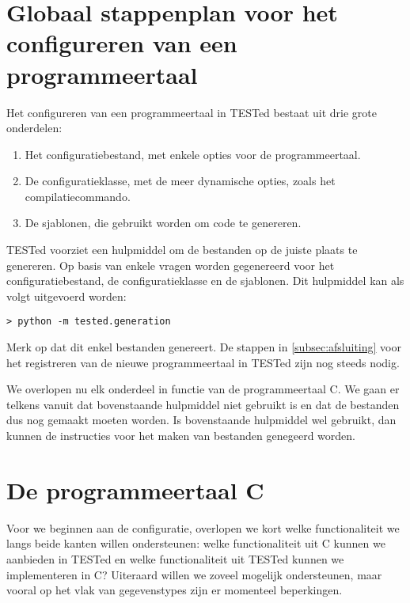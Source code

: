 \section{Globaal stappenplan voor het configureren van een programmeertaal}\label{sec:globaal-stappenplan-voor-het-configureren}

Het configureren van een programmeertaal in TESTed bestaat uit drie grote onderdelen:

\begin{enumerate}
    \item Het configuratiebestand, met enkele opties voor de programmeertaal.
    \item De configuratieklasse, met de meer dynamische opties, zoals het compilatiecommando.
    \item De sjablonen, die gebruikt worden om code te genereren.
\end{enumerate}

TESTed voorziet een hulpmiddel om de bestanden op de juiste plaats te genereren.
Op basis van enkele vragen worden  gegenereerd voor het configuratiebestand, de configuratieklasse en de sjablonen.
Dit hulpmiddel kan als volgt uitgevoerd worden:

\begin{verbatim}
> python -m tested.generation
\end{verbatim}

Merk op dat dit enkel bestanden genereert.
De stappen in \cref{subsec:afsluiting} voor het registreren van de nieuwe programmeertaal in TESTed zijn nog steeds nodig.

We overlopen nu elk onderdeel in functie van de programmeertaal C\@.
We gaan er telkens vanuit dat bovenstaande hulpmiddel niet gebruikt is en dat de bestanden dus nog gemaakt moeten worden.
Is bovenstaande hulpmiddel wel gebruikt, dan kunnen de instructies voor het maken van bestanden genegeerd worden.

\section{De programmeertaal C}\label{sec:de-programmeertaal-c}

Voor we beginnen aan de configuratie, overlopen we kort welke functionaliteit we langs beide kanten willen ondersteunen: welke functionaliteit uit C kunnen we aanbieden in TESTed en welke functionaliteit uit TESTed kunnen we implementeren in C?
Uiteraard willen we zoveel mogelijk ondersteunen, maar vooral op het vlak van gegevenstypes zijn er momenteel beperkingen.

